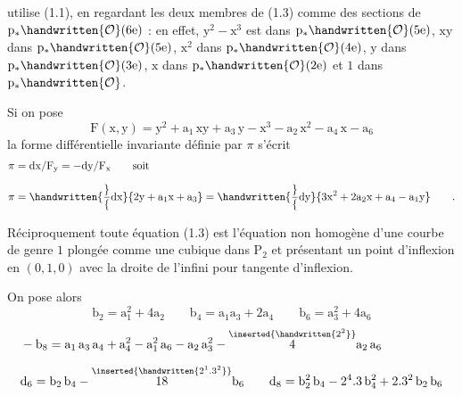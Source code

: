 utilise (1.1), en regardant les deux membres de (1.3) comme des sections de $\mathrm{p}_{*}\handwritten{\mathcal{O}}(6\mathrm{e})$ : en effet, $\mathrm{y}^{2}-\mathrm{x}^{3}$ est dans $\mathrm{p}_{*}\handwritten{\mathcal{O}}(5\mathrm{e})$, $\mathrm{xy}$ dans $\mathrm{p}_{*}\handwritten{\mathcal{O}}(5\mathrm{e})$, $\mathrm{x}^{2}$ dans $\mathrm{p}_{*}\handwritten{\mathcal{O}}(4\mathrm{e})$, $\mathrm{y}$ dans $\mathrm{p}_{*}\handwritten{\mathcal{O}}(3\mathrm{e})$, $\mathrm{x}$ dans $\mathrm{p}_{*}\handwritten{\mathcal{O}}(2\mathrm{e})$ et $1$ dans $\mathrm{p}_{*}\handwritten{\mathcal{O}}$.

Si on pose
\[
\mathrm{F}(\mathrm{x},\mathrm{y})=\mathrm{y}^{2}+\mathrm{a}_{1}\,\mathrm{xy}+\mathrm{a}_{3}\,\mathrm{y}-\mathrm{x}^{3}-\mathrm{a}_{2}\,\mathrm{x}^{2}-\mathrm{a}_{4}\,\mathrm{x}-\mathrm{a}_{6}
\]
la forme différentielle invariante définie par $\pi$ s'écrit
\[
\begin{aligned}
\pi&=\mathrm{dx}/\mathrm{F}_{\mathrm{y}}=-\mathrm{dy}/\mathrm{F}_{\mathrm{x}}\qquad\text{soit}\\[.65em]
\pi&=\handwritten{\frac}{\mathrm{dx}}{2\mathrm{y}+\mathrm{a}_{1}\mathrm{x}+\mathrm{a}_{3}}
=\handwritten{\frac}{\mathrm{dy}}{3\mathrm{x}^{2}+2\mathrm{a}_{2}\mathrm{x}+\mathrm{a}_{4}-\mathrm{a}_{1}\mathrm{y}}\qquad.
\end{aligned}
\]

Réciproquement toute équation (1.3) est l'équation non homogène d'une courbe de genre $1$ plongée comme une cubique dans $\mathrm{P}_{2}$ et présentant un point d'inflexion en $(0,1,0)$ avec la droite de l'infini pour tangente d'inflexion.

On pose alors
\begingroup
\makeatletter\tagsleft@true\makeatother
\[
\mathrm{b}_{2}=\mathrm{a}_{1}^{2}+4\mathrm{a}_{2}\qquad
\mathrm{b}_{4}=\mathrm{a}_{1}\mathrm{a}_{3}+2\mathrm{a}_{4}\qquad
\mathrm{b}_{6}=\mathrm{a}_{3}^{2}+4\mathrm{a}_{6}
\tag*{(1.4)}
\]
\[
\begin{aligned}
&-\mathrm{b}_{8}=\mathrm{a}_{1}\,\mathrm{a}_{3}\,\mathrm{a}_{4}+\mathrm{a}_{4}^{2}-\mathrm{a}_{1}^{2}\,\mathrm{a}_{6}-\mathrm{a}_{2}\,\mathrm{a}_{3}^{2}-\overset{\inserted{\handwritten{2^{2}}}}{4}\mathrm{a}_{2}\,\mathrm{a}_{6}\\[.55em]
&\mathrm{d}_{6}=\mathrm{b}_{2}\,\mathrm{b}_{4}-\overset{\inserted{\handwritten{2^{1}.3^{2}}}}{18}\mathrm{b}_{6}\qquad
\mathrm{d}_{8}=\mathrm{b}_{2}^{2}\,\mathrm{b}_{4}-2^{4}.3\,\mathrm{b}_{4}^{2}+2.3^{2}\,\mathrm{b}_{2}\,\mathrm{b}_{6}
\end{aligned}
\]
\reversemarginpar\margin{\handwritten{$\unsure{\backslash}$}}\normalmarginpar
\endgroup

